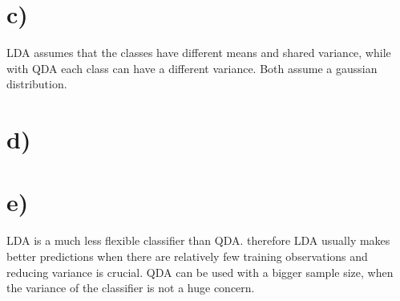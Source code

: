 \documentclass[12pt]{article}
\begin{document}
\section*{c)}
LDA assumes that the classes have different means and shared variance,
while with QDA each class can have a different variance. Both assume a gaussian distribution.
\section*{d)}
\section*{e)}
LDA is a much less flexible classifier than QDA.
therefore LDA usually makes better predictions when there are
relatively few training observations and reducing variance is crucial.
QDA can be used with a bigger sample size, when the variance of the
classifier is not a huge concern.
\end{document}
